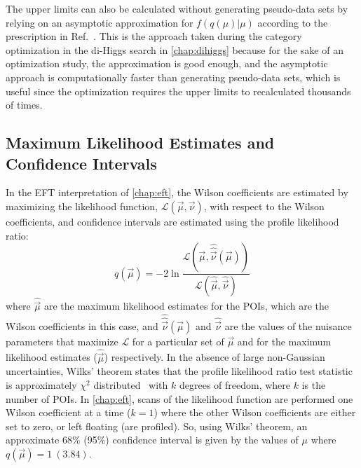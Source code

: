 The upper limits can also be calculated without generating pseudo-data sets by relying on an asymptotic approximation for $f(q(\mu)|\mu)$ according to the prescription in Ref.~\cite{Cowan:2010js}. This is the approach taken during the category optimization in the di-Higgs search in \cref{chap:dihiggs} because for the sake of an optimization study, the approximation is good enough, and the asymptotic approach is computationally faster than generating pseudo-data sets, which is useful since the optimization requires the upper limits to recalculated thousands of times. 

\subsection{Maximum Likelihood Estimates and Confidence Intervals}\label{sec:stats_mle}

In the EFT interpretation of \cref{chap:eft}, the Wilson coefficients are estimated by maximizing the likelihood function, $\mathcal{L}(\vec{\mu},\vec{\nu})$, with respect to the Wilson coefficients, and confidence intervals are estimated using the profile likelihood ratio:
\begin{equation}
  q(\vec{\mu}) = -2 \ln \dfrac{\mathcal{L}(\vec{\mu}, \hat{\hat{\vec{\nu}}}(\vec{\mu}))}{\mathcal{L}(\hat{\vec{\mu}}, \hat{\vec{\nu}})}\label{eq:mle_test_statistic}
\end{equation}
where $\hat{\vec{\mu}}$ are the maximum likelihood estimates for the POIs, which are the Wilson coefficients in this case, and $\hat{\hat{\vec{\nu}}}(\vec{\mu})$ and $\hat{\vec{\nu}}$ are the values of the nuisance parameters that maximize $\mathcal{L}$ for a particular set of $\vec{\mu}$ and for the maximum likelihood estimates ($\hat{\vec{\mu}}$) respectively. In the absence of large non-Gaussian uncertainties, Wilks' theorem states that the profile likelihood ratio test statistic is approximately $\chi^2$ distributed~\cite{Wilks,Wald,Engle} with $k$ degrees of freedom, where $k$ is the number of POIs. In \cref{chap:eft}, scans of the likelihood function are performed one Wilson coefficient at a time ($k=1$) where the other Wilson coefficients are either set to zero, or left floating (are profiled). So, using Wilks' theorem, an approximate 68\% (95\%) confidence interval is given by the values of $\mu$ where $q(\vec{\mu}) = 1\ (3.84)$.

